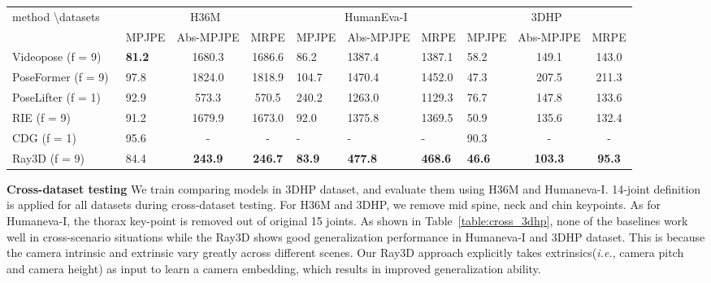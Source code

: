 \documentclass[10pt,twocolumn,letterpaper]{article}
\def\ie{\emph{i.e.}}
\begin{document}
\begin{table*}[htbp]
\caption{Cross dataset evaluation. We adopt a 14-joint skeleton training on 3DHP, testing on H36M, Humaneva-I and 3DHP datasets.
MPJPE, Abs-MPJPE and MRPE are reported. The unit of all numbers is mm. The best results are in \textbf{bold}. }
\tiny
\centering
\small
\vskip-12pt
\begin{tabular}{@{}l|lcc|lll|lcc@{}}
\toprule
method \textbackslash datasets & \multicolumn{3}{c|}{H36M} & \multicolumn{3}{c|}{HumanEva-I} & \multicolumn{3}{c}{3DHP} \\ 
                               & MPJPE  & Abs-MPJPE   & MRPE    & MPJPE   & Abs-MPJPE  & MRPE  & MPJPE          & Abs-MPJPE  & MRPE  \\ \midrule
Videopose (f = 9)~\cite{dario2019videopose}                      & \textbf{81.2}   & 1680.3      & 1686.6  & 86.2    & 1387.4     & 1387.1& 58.2           & 149.1      & 143.0 \\
PoseFormer (f = 9)~\cite{ce2021poseformer}                     & 97.8   & 1824.0      & 1818.9  & 104.7   & 1470.4     & 1452.0& 47.3           & 207.5      & 211.3 \\
PoseLifter (f = 1)~\cite{ju2019absposelifter}                    & 92.9   & 573.3       & 570.5   & 240.2   & 1263.0     & 1129.3& 76.7           & 147.8      & 133.6 \\
RIE (f = 9)~\cite{wenkang2021improving}                           & 91.2   & 1679.9      & 1673.0  & 92.0    & 1375.8     & 1369.5& 50.9           & 135.6      & 132.4 \\
CDG (f = 1) ~\cite{WangSF20} & 95.6 & - & - & - & - & - & 90.3 & - & - \\
Ray3D (f = 9)                         & 84.4   & \textbf{243.9}       & \textbf{246.7}   & \textbf{83.9}    & \textbf{477.8}      & \textbf{468.6} & \textbf{46.6}           & \textbf{103.3}      & \textbf{95.3}  \\ \bottomrule
\end{tabular}
\label{table:cross_3dhp}
\end{table*}

\noindent\textbf{Cross-dataset testing}
We train comparing models in 3DHP dataset, and evaluate them using H36M and Humaneva-I. 14-joint definition is applied for all datasets during cross-dataset testing. For H36M and 3DHP, we remove mid spine, neck and chin keypoints. As for Humaneva-I, the thorax key-point is removed out of original 15 joints. As shown in Table~\ref{table:cross_3dhp}, none of the baselines work well in cross-scenario situations while the Ray3D shows good generalization performance in Humaneva-I and 3DHP dataset. This is because the camera intrinsic and extrinsic vary greatly across different scenes. Our Ray3D approach explicitly takes extrinsics(\ie, camera pitch and camera height) as input to learn a camera embedding, which results in improved generalization ability.
\end{document}
